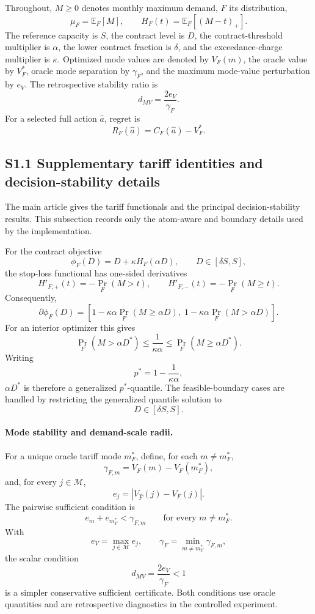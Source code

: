 \documentclass[AMA,Times1COL]{WileyNJDv5}
\begin{document}
Throughout, \(M\geq0\) denotes monthly maximum demand,
\(F\) its distribution,
\[
\mu_F=\mathbb E_F[M],
\qquad
H_F(t)=\mathbb E_F[(M-t)_+].
\]
The reference capacity is \(S\), the contract level is \(D\),
the contract-threshold multiplier is \(\alpha\), the lower contract
fraction is \(\delta\), and the exceedance-charge multiplier is
\(\kappa\). Optimized mode values are denoted by \(V_F(m)\),
the oracle value by \(V_F^\ast\), oracle mode separation by
\(\gamma_F\), and the maximum mode-value perturbation by \(e_V\).
The retrospective stability ratio is
\[
d_{MV}=\frac{2e_V}{\gamma_F}.
\]
For a selected full action \(\widehat a\), regret is
\[
R_F(\widehat a)
=
C_F(\widehat a)-V_F^\ast.
\]



\subsection*{S1.1 Supplementary tariff identities and decision-stability details}

The main article gives the tariff functionals and the principal
decision-stability results. This subsection records only the
atom-aware and boundary details used by the implementation.

For the contract objective
\[
\phi_F(D)
=
D+\kappa H_F(\alpha D),
\qquad
D\in[\delta S,S],
\]
the stop-loss functional has one-sided derivatives
\[
H'_{F,+}(t)
=
-\Pr_F(M>t),
\qquad
H'_{F,-}(t)
=
-\Pr_F(M\geq t).
\]
Consequently,
\[
\partial\phi_F(D)
=
\left[
1-\kappa\alpha\Pr_F(M\geq\alpha D),
\;
1-\kappa\alpha\Pr_F(M>\alpha D)
\right].
\]
For an interior optimizer this gives
\[
\Pr_F(M>\alpha D^\ast)
\leq
\frac{1}{\kappa\alpha}
\leq
\Pr_F(M\geq\alpha D^\ast).
\]
Writing
\[
p^\ast
=
1-\frac{1}{\kappa\alpha},
\]
\(\alpha D^\ast\) is therefore a generalized \(p^\ast\)-quantile.
The feasible-boundary cases are handled by restricting the generalized
quantile solution to
\[
D\in[\delta S,S].
\]

\paragraph*{Mode stability and demand-scale radii.}
For a unique oracle tariff mode $m_F^\ast$, define, for each
$m\neq m_F^\ast$,
\[
\gamma_{F,m}=V_F(m)-V_F(m_F^\ast),
\]
and, for every $j\in\mathcal M$,
\[
e_j=\left|V_{\widehat F}(j)-V_F(j)\right|.
\]
The pairwise sufficient condition is
\[
e_m+e_{m_F^\ast}<\gamma_{F,m}
\qquad
\text{for every }m\neq m_F^\ast.
\]
With
\[
e_V=\max_{j\in\mathcal M}e_j,
\qquad
\gamma_F=\min_{m\neq m_F^\ast}\gamma_{F,m},
\]
the scalar condition
\[
d_{MV}=\frac{2e_V}{\gamma_F}<1
\]
is a simpler conservative sufficient certificate. Both conditions
use oracle quantities and are retrospective diagnostics in the
controlled experiment.
\end{document}
